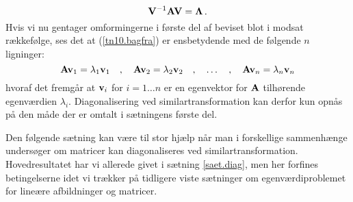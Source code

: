 \begin{bevis}
\begin{equation} \label{tn10.bagfra}
\mathbf{V}^{-1} \mathbf{A} \mathbf{V} = \bm{\Lambda}\,.
\end{equation}
Hvis vi nu gentager omformingerne i første del af beviset  blot i modsat rækkefølge, ses det at (\ref{tn10.bagfra}) er ensbetydende med de følgende $n$ ligninger:
\begin{equation}
\mathbf{A}\mathbf{v}_1 = \lambda_1 \mathbf{v}_1 \quad , \quad \mathbf{A}\mathbf{v}_2 = \lambda_2 \mathbf{v}_2 \quad , \quad \ldots \quad , \quad \mathbf{A}\mathbf{v}_n = \lambda_n \mathbf{v}_n
\end{equation}
hvoraf det fremgår at $\mathbf{v}_i$ for $i=1\ldots n$ er en egenvektor for $ \mathbf{A} $ tilhørende egenværdien $ \lambda_i $. \bs
Diagonalisering ved similartransformation kan derfor kun opnås på den måde der er omtalt i sætningens første del.
\end{bevis}

Den følgende sætning kan være til stor hjælp når man i forskellige sammenhænge undersøger om matricer kan diagonaliseres ved similartransformation. Hovedresultatet har vi allerede givet i sætning \ref{saet.diag}, men her  forfines betingelserne idet vi trækker på tidligere viste sætninger om egenværdiproblemet for lineære afbildninger og matricer.

